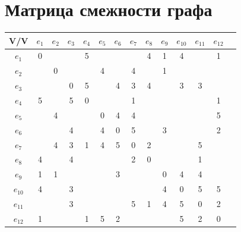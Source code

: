 \documentclass[12pt,a4paper]{report}
\begin{document}
\section*{Матрица смежности графа}
\begin{tabular}{|c|c|c|c|c|c|c|c|c|c|c|c|c|c|}
    \hline
    V/V & $e_{1}$ & $e_{2}$ & $e_{3}$ & $e_{4}$ & $e_{5}$ & $e_{6}$ & $e_{7}$ & $e_{8}$ & $e_{9}$ & $e_{10}$ & $e_{11}$ & $e_{12}$ \\
    \hline
    $e_{1}$  & 0 &   &   & 5 &   &   &   & 4 & 1 & 4 &   & 1 \\
    \hline
    $e_{2}$  &   & 0 &   &   & 4 &   & 4 &   & 1 &   &   &   \\
    \hline
    $e_{3}$  &   &   & 0 & 5 &   & 4 & 3 & 4 &   & 3 & 3 &   \\
    \hline
    $e_{4}$  & 5 &   & 5 & 0 &   &   & 1 &   &   &   &   & 1 \\
    \hline
    $e_{5}$  &   & 4 &   &   & 0 & 4 & 4 &   &   &   &   & 5 \\
    \hline
    $e_{6}$  &   &   & 4 &   & 4 & 0 & 5 &   & 3 &   &   & 2 \\
    \hline
    $e_{7}$  &   & 4 & 3 & 1 & 4 & 5 & 0 & 2 &   &   & 5 &   \\
    \hline
    $e_{8}$  & 4 &   & 4 &   &   &   & 2 & 0 &   &   & 1 &   \\
    \hline
    $e_{9}$  & 1 & 1 &   &   &   & 3 &   &   & 0 & 4 & 4 &   \\
    \hline
    $e_{10}$ & 4 &   & 3 &   &   &   &   &   & 4 & 0 & 5 & 5 \\
    \hline
    $e_{11}$ &   &   & 3 &   &   &   & 5 & 1 & 4 & 5 & 0 & 2 \\
    \hline
    $e_{12}$ & 1 &   &   & 1 & 5 & 2 &   &   &   & 5 & 2 & 0 \\
    \hline
\end{tabular}
\end{document}
